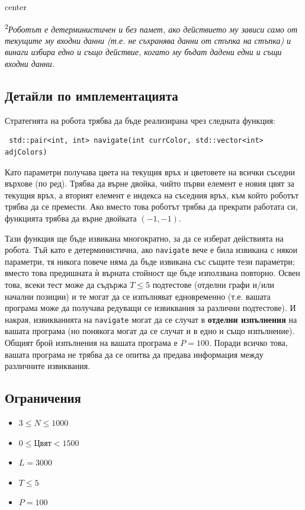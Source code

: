 \documentclass[12pt]{article}
\begin{document}
\begin{adjustbox}{center}
	
\end{adjustbox}

\textsuperscript{2}\textit{Роботът е детерминистичен и без памет, ако действието му зависи само от текущите му входни данни (т.е. не съхранява данни от стъпка на стъпка) и винаги избира едно и също действие, когато му бъдат дадени едни и същи входни данни.}

\subsection{Детайли по имплементацията}
Стратегията на робота трябва да бъде реализирана чрез следната функция:
\begin{lstlisting}
 std::pair<int, int> navigate(int currColor, std::vector<int> adjColors)
\end{lstlisting}

Като параметри получава цвета на текущия връх и цветовете на всички съседни върхове (по ред). Трябва да върне двойка, чийто първи елемент е новия цвят за текущия връх, а вторият елемент е индекса на съседния връх, към който роботът трябва да се премести. Ако вместо това роботът трябва да прекрати работата си, функцията трябва да върне двойката $(-1, -1)$.

Тази функция ще бъде извикана многократно, за да се изберат действията на робота. Тъй като е детерминистична, ако \texttt{navigate} вече е била извикана с някои параметри, тя никога повече няма да бъде извикана със същите тези параметри; вместо това предишната ѝ върната стойност ще бъде използвана повторно. Освен това, всеки тест може да съдържа $T \leq 5$ подтестове (отделни графи и/или начални позиции) и те могат да се изпълняват едновременно (т.е. вашата програма може да получава редуващи се извиквания за различни подтестове). И накрая, извикванията на \texttt{navigate} могат да се случат в \textbf{отделни изпълнения} на вашата програма (но понякога могат да се случат и в едно и също изпълнение). Общият брой изпълнения на вашата програма е $P = 100$. Поради всичко това, вашата програма не трябва да се опитва да предава информация между различните извиквания.

\subsection{Ограничения}

\begin{itemize}
\item $3 \leq N \leq 1000$
\item $0 \leq \mathrm{Цвят} < 1500$
\item $L = 3000$
\item $T \leq 5$
\item $P = 100$
\end{itemize}
\end{document}
